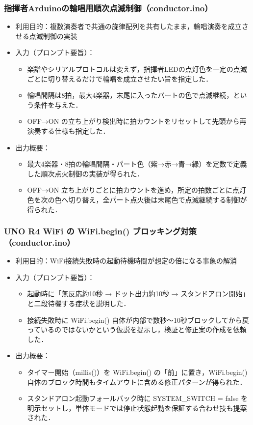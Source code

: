 \documentclass[lualatex,paper=a4paper,jafontsize=11.5pt,jafontscale=1.05]{jlreq}
\begin{document}
\subsubsection{指揮者Arduinoの輪唱用順次点滅制御（conductor.ino）}
\begin{itemize}
    \item 利用目的：複数演奏者で共通の旋律配列を共有したまま，輪唱演奏を成立させる点滅制御の実装
    \item 入力（プロンプト要旨）：
    \begin{itemize}
        \item 楽譜やシリアルプロトコルは変えず，指揮者LEDの点灯色を一定の点滅ごとに切り替えるだけで輪唱を成立させたい旨を指定した．
        \item 輪唱間隔は8拍，最大4楽器，末尾に入ったパートの色で点滅継続，という条件を与えた．
        \item OFF→ON の立ち上がり検出時に拍カウントをリセットして先頭から再演奏する仕様も指定した．
    \end{itemize}
    \item 出力概要：
    \begin{itemize}
        \item 最大4楽器・8拍の輪唱間隔・パート色（紫→赤→青→緑）を定数で定義した順次点火制御の実装が得られた．
        \item OFF→ON 立ち上がりごとに拍カウントを進め，所定の拍数ごとに点灯色を次の色へ切り替え，全パート点火後は末尾色で点滅継続する制御が得られた．
    \end{itemize}
\end{itemize}

\subsubsection{UNO R4 WiFi の WiFi.begin() ブロッキング対策（conductor.ino）}
\begin{itemize}
    \item 利用目的：WiFi接続失敗時の起動待機時間が想定の倍になる事象の解消
    \item 入力（プロンプト要旨）：
    \begin{itemize}
        \item 起動時に「無反応約10秒 → ドット出力約10秒 → スタンドアロン開始」と二段待機する症状を説明した．
        \item 接続失敗時に WiFi.begin() 自体が内部で数秒〜10秒ブロックしてから戻っているのではないかという仮説を提示し，検証と修正案の作成を依頼した．
    \end{itemize}
    \item 出力概要：
    \begin{itemize}
        \item タイマー開始（millis()）を WiFi.begin() の「前」に置き，WiFi.begin() 自体のブロック時間もタイムアウトに含める修正パターンが得られた．
        \item スタンドアロン起動フォールバック時に SYSTEM\_SWITCH = false を明示セットし，単体モードでは停止状態起動を保証する合わせ技も提案された．
    \end{itemize}
\end{itemize}
\end{document}

